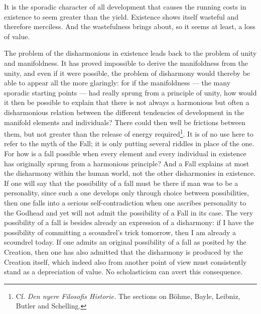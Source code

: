 \documentclass[12pt,a4paper,openany]{book}
\newcommand{\opage}[1]{\marginnote{\footnotesize\textit{[#1]}}}
\begin{document}
It is the sporadic character of all development that causes the running costs in
existence to seem greater than the yield. Existence shows itself wasteful and therefore
merciless. And the wastefulness brings about, so it seems at least, a loss of value.

The problem of the disharmonious in existence leads back to the problem of unity and
manifoldness. It has proved impossible to derive the manifoldness from the unity, and
even if it were possible, the problem of disharmony would thereby be able to appear all
the more glaringly: for if the manifoldness --- the many sporadic starting points --- had
really sprung from a principle of unity, how would it then be possible to explain that
there is not always a harmonious but often a disharmonious relation between the different
tendencies of development in the manifold elements and individuals? There could then well
be frictions between them, but not greater than the release of energy required\footnote[1]{Cf. \textit{Den nyere Filosofis Historie.} The sections on Böhme, Bayle, Leibniz, Butler and Schelling.}.
It is of no use here to refer to the myth of the Fall; it is only putting several riddles
in place of the one. For how is a fall possible when every element and every individual
in existence has originally sprung from a harmonious principle? And a Fall explains at
most the disharmony within the human world, not the other disharmonies in existence. If
one will say that the possibility of a fall
\setcounter{footnote}{0}%
\opage{244}must be there if man was to be a personality, since such a one develops only through
choice between possibilities, then one falls into a serious self-contradiction when one
ascribes personality to the Godhead and yet will not admit the possibility of a Fall in
its case. The very possibility of a fall is besides already an expression of a
disharmony: if I have the possibility of committing a scoundrel's trick tomorrow, then I
am already a scoundrel today. If one admits an original possibility of a fall as posited
by the Creation, then one has also admitted that the disharmony is produced by the
Creation itself, which indeed also from another point of view must consistently stand as
a depreciation of value. No scholasticism can avert this consequence.
\end{document}
